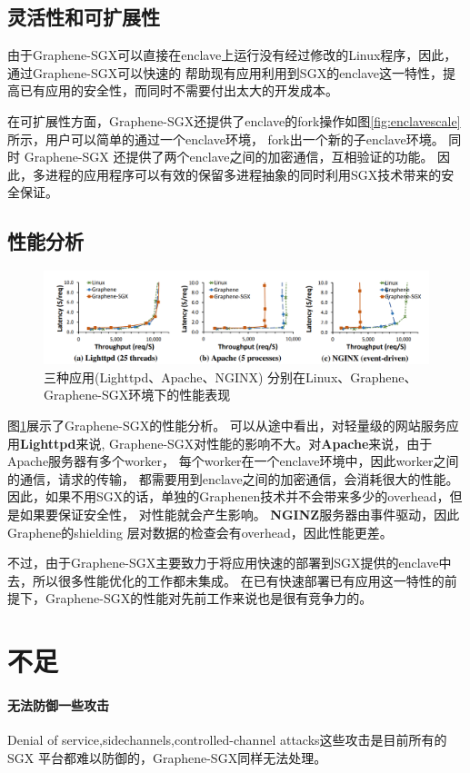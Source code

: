 \subsection{灵活性和可扩展性}
由于Graphene-SGX可以直接在enclave上运行没有经过修改的Linux程序，因此，通过Graphene-SGX可以快速的
帮助现有应用利用到SGX的enclave这一特性，提高已有应用的安全性，而同时不需要付出太大的开发成本。

在可扩展性方面，Graphene-SGX还提供了enclave的fork操作如图\ref{fig:enclavescale}所示，用户可以简单的通过一个enclave环境，
fork出一个新的子enclave环境。
同时 Graphene-SGX 还提供了两个enclave之间的加密通信，互相验证的功能。
因此，多进程的应用程序可以有效的保留多进程抽象的同时利用SGX技术带来的安全保证。


\subsection{性能分析}
\begin{figure}[]
    \centering
    \includegraphics[width=1\textwidth]{1.png}    
    \caption{三种应用(Lighttpd、Apache、NGINX)
    分别在Linux、Graphene、Graphene-SGX环境下的性能表现}
    \label{23333}
\end{figure}
图\ref{23333}展示了Graphene-SGX的性能分析。
可以从途中看出，对轻量级的网站服务应用\textbf{Lighttpd}来说,
Graphene-SGX对性能的影响不大。对\textbf{Apache}来说，由于Apache服务器有多个worker，
每个worker在一个enclave环境中，因此worker之间的通信，请求的传输，
都需要用到enclave之间的加密通信，会消耗很大的性能。
因此，如果不用SGX的话，单独的Graphenen技术并不会带来多少的overhead，但是如果要保证安全性，
对性能就会产生影响。
\textbf{NGINZ}服务器由事件驱动，因此Graphene的shielding 层对数据的检查会有overhead，因此性能更差。

不过，由于Graphene-SGX主要致力于将应用快速的部署到SGX提供的enclave中去，所以很多性能优化的工作都未集成。
在已有快速部署已有应用这一特性的前提下，Graphene-SGX的性能对先前工作来说也是很有竞争力的。


\section{不足}
\paragraph{无法防御一些攻击}
Denial of service,sidechannels,controlled-channel attacks这些攻击是目前所有的 SGX 平台都难以防御的，Graphene-SGX同样无法处理。
